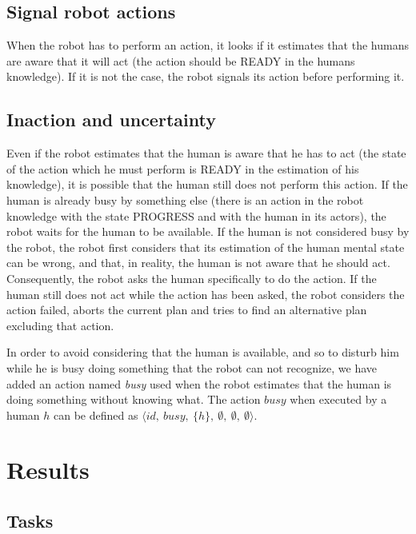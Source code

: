 \documentclass[english,a4paper,11pt,twoside]{StyleThese}
\begin{document}
\subsection{Signal robot actions}

When the robot has to perform an action, it looks if it estimates that the humans are aware that it will act (the action should be READY in the humans knowledge). If it is not the case, the robot signals its action before performing it.



\subsection{Inaction and uncertainty}

Even if the robot estimates that the human is aware that he has to act (the state of the action which he must perform is READY in the estimation of his knowledge), it is possible that the human still does not perform this action. If the human is already busy by something else (there is an action in the robot knowledge with the state PROGRESS and with the human in its actors), the robot waits for the human to be available. If the human is not considered busy by the robot, the robot first considers that its estimation of the human mental state can be wrong, and that, in reality, the human is not aware that he should act. Consequently, the robot asks the human specifically to do the action. If the human still does not act while the action has been asked, the robot considers the action failed, aborts the current plan and tries to find an alternative plan excluding that action.

In order to avoid considering that the human is available, and so to disturb him while he is busy doing something that the robot can not recognize, we have added an action named \textit{busy} used when the robot estimates that the human is doing something without knowing what. The action $busy$ when executed by a human $h$ can be defined as $\langle id,\ busy,\ \{h\},\ \emptyset,\ \emptyset,\ \emptyset \rangle$.


\section{Results}

\label{sec:resultsTOM}

\subsection{Tasks}
\end{document}
